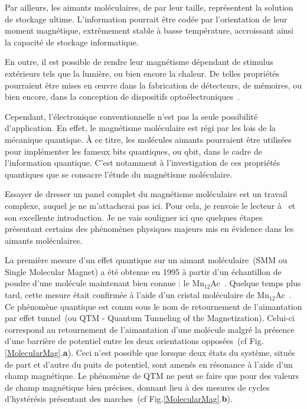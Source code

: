 Par ailleurs, les aimants moléculaires, de par leur taille, représentent la solution de stockage ultime. L'information pourrait être codée par l'orientation de leur moment magnétique, extrêmement stable à basse température, accroissant ainsi la capacité de stockage informatique.

En outre, il est possible de rendre leur magnétisme dépendant de stimulus extérieurs tels que la lumière, ou bien encore la chaleur. De telles propriétés pourraient \^etre mises en œuvre dans la fabrication de détecteurs, de mémoires, ou bien encore, dans la conception de dispositifs optoélectroniques~\cite{Sanvito2011}.

Cependant, l'électronique conventionnelle n'est pas la seule possibilité d'application. En effet, le magnétisme moléculaire est régi par les lois de la mécanique quantique. À ce titre, les molécules aimants pourraient \^etre utilisées pour implémenter les fameux bits quantiques, ou qbit, dans le cadre de l'information quantique. C'est notamment à l'investigation de ces propriétés quantiques que se consacre l'étude du magnétisme moléculaire.
 
Essayer de dresser un panel complet du magnétisme moléculaire est un travail complexe, auquel je ne m'attacherai pas ici. Pour cela, je renvoie le lecteur à~\cite{Gatteschi2006} et son excellente introduction. Je ne vais souligner ici que quelques étapes présentant certains des phénomènes physiques majeurs mis en évidence dans les aimants moléculaires.

La première mesure d'un effet quantique sur un aimant moléculaire~(SMM ou Single Molecular Magnet) a été obtenue en 1995 à partir d'un échantillon de poudre d'une molécule maintenant bien connue : le Mn$_{12}$Ac~\cite{Friedman1996}. Quelque temps plus tard, cette mesure était confirmée à l'aide d'un cristal moléculaire de Mn$_{12}$Ac~\cite{Thomas1996}. Ce phénomène quantique est connu sous le nom de retournement de l'aimantation par effet tunnel~(ou QTM - Quantum Tunneling of the Magnetization).
Celui-ci correspond au retournement de l'aimantation d'une molécule malgré la présence d'une barrière de potentiel entre les deux orientations opposées~(cf Fig.\ref{MolecularMag}.\textbf{a}). Ceci n'est possible que lorsque deux états du système, situés de part et d'autre du puits de potentiel, sont amenés en résonance à l'aide d'un champ magnétique. Le phénomène de QTM ne peut se faire que pour des valeurs de champ magnétique bien précises, donnant lieu à des mesures de cycles d'hystérésis présentant des marches~(cf Fig.\ref{MolecularMag}.\textbf{b}).


